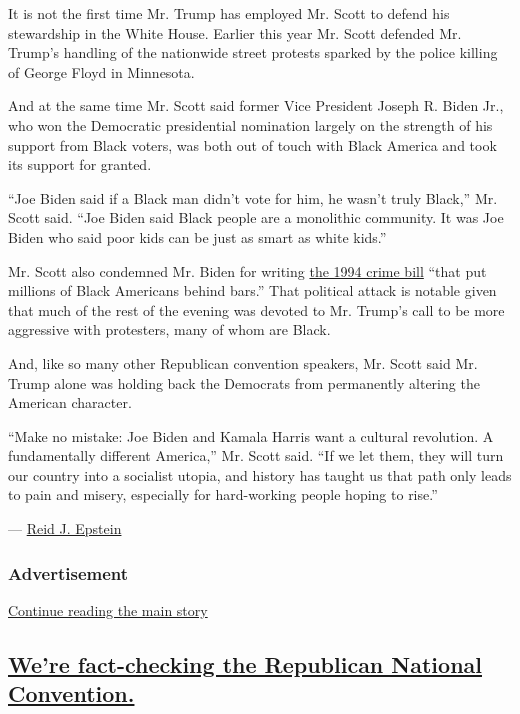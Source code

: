 It is not the first time Mr. Trump has employed Mr. Scott to defend his
stewardship in the White House. Earlier this year Mr. Scott defended Mr.
Trump's handling of the nationwide street protests sparked by the police
killing of George Floyd in Minnesota.

And at the same time Mr. Scott said former Vice President Joseph R.
Biden Jr., who won the Democratic presidential nomination largely on the
strength of his support from Black voters, was both out of touch with
Black America and took its support for granted.

``Joe Biden said if a Black man didn't vote for him, he wasn't truly
Black,'' Mr. Scott said. ``Joe Biden said Black people are a monolithic
community. It was Joe Biden who said poor kids can be just as smart as
white kids.''

Mr. Scott also condemned Mr. Biden for writing
\href{https://www.nytimes3xbfgragh.onion/2019/06/25/us/joe-biden-crime-laws.html}{the
1994 crime bill} ``that put millions of Black Americans behind bars.''
That political attack is notable given that much of the rest of the
evening was devoted to Mr. Trump's call to be more aggressive with
protesters, many of whom are Black.

And, like so many other Republican convention speakers, Mr. Scott said
Mr. Trump alone was holding back the Democrats from permanently altering
the American character.

``Make no mistake: Joe Biden and Kamala Harris want a cultural
revolution. A fundamentally different America,'' Mr. Scott said. ``If we
let them, they will turn our country into a socialist utopia, and
history has taught us that path only leads to pain and misery,
especially for hard-working people hoping to rise.''

--- \href{https://www.nytimes3xbfgragh.onion/by/reid-j-epstein}{Reid J.
Epstein}

\hypertarget{advertisement}{%
\subsubsection{Advertisement}\label{advertisement}}

\protect\hyperlink{after-dfp-ad-mid1}{Continue reading the main story}

\hypertarget{were-fact-checking-the-republican-national-convention}{%
\subsection{\texorpdfstring{\protect\hyperlink{were-fact-checking-the-republican-national-convention}{We're
fact-checking the Republican National
Convention.}}{We're fact-checking the Republican National Convention.}}\label{were-fact-checking-the-republican-national-convention}}

